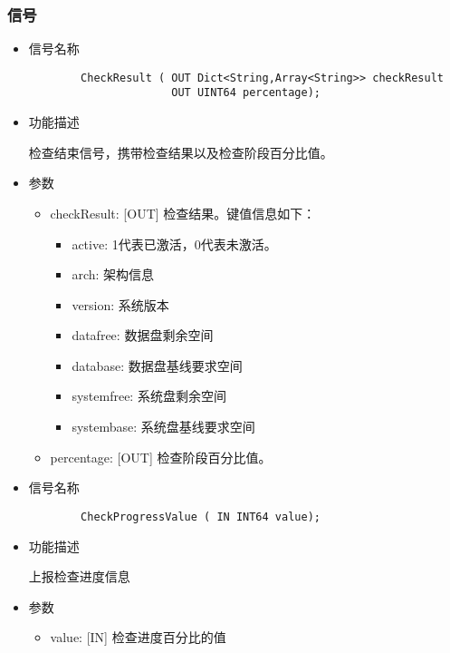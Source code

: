 \documentclass{utart}
\begin{document}
\subsubsection{信号}
\begin{itemize}
    \item 信号名称
    
    \begin{verbatim}
        CheckResult ( OUT Dict<String,Array<String>> checkResult
                      OUT UINT64 percentage);
      \end{verbatim}

    \item 功能描述
    
    检查结束信号，携带检查结果以及检查阶段百分比值。
    \item 参数
        \begin{itemize}
            \item checkResult: [OUT] 检查结果。键值信息如下：
                \begin{itemize}
                    \item active: 1代表已激活，0代表未激活。
                    \item arch: 架构信息
                    \item version: 系统版本
                    \item datafree: 数据盘剩余空间
                    \item database: 数据盘基线要求空间
                    \item systemfree: 系统盘剩余空间
                    \item systembase: 系统盘基线要求空间
                \end{itemize}
            \item percentage: [OUT] 检查阶段百分比值。
        \end{itemize}
\end{itemize}

\begin{itemize}
    \item 信号名称
    
    \begin{verbatim}
        CheckProgressValue ( IN INT64 value);
      \end{verbatim}

    \item 功能描述
    
    上报检查进度信息
    \item 参数
        \begin{itemize}
            \item value: [IN] 检查进度百分比的值
        \end{itemize}
\end{itemize}
\end{document}
